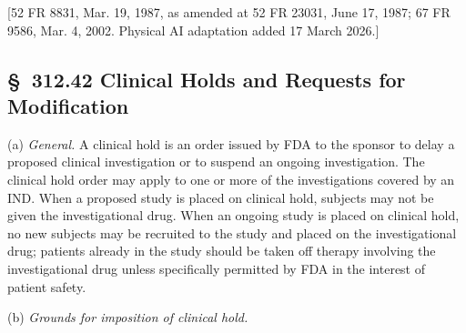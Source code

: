 \documentclass[11pt]{article}
\begin{document}
[52 FR 8831, Mar. 19, 1987, as amended at 52 FR 23031, June 17, 1987; 67 FR 9586, Mar. 4, 2002. Physical AI adaptation added 17 March 2026.]

\subsection{\S~312.42 Clinical Holds and Requests for Modification}

(a) \textit{General.} A clinical hold is an order issued by FDA to the sponsor to delay a proposed clinical investigation or to suspend an ongoing investigation. The clinical hold order may apply to one or more of the investigations covered by an IND. When a proposed study is placed on clinical hold, subjects may not be given the investigational drug. When an ongoing study is placed on clinical hold, no new subjects may be recruited to the study and placed on the investigational drug; patients already in the study should be taken off therapy involving the investigational drug unless specifically permitted by FDA in the interest of patient safety.

(b) \textit{Grounds for imposition of clinical hold.}
\end{document}
